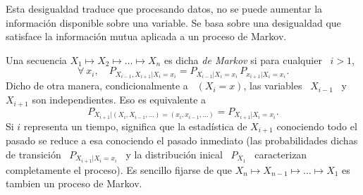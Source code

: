 
\label{Ssec:SZ:ProcDatos}

Esta  desigualdad  traduce  que  procesando  datos,  no  se  puede  aumentar  la
informaci\'on disponible sobre  una variable. Se basa sobre  una desigualdad que
satisface la informaci\'on mutua aplicada a un proceso de Markov.

\begin{definicion}
  Una secuencia  $X_1 \mapsto X_2 \mapsto  \ldots \mapsto X_n$ es  dicha {\it de
    Markov}   si   para  cualquier \   $i   >   1$,
  \[
  \forall \: x_i, \quad P_{X_{i-1},X_{i+1}|X_i=x_i} = P_{X_{i-1}|X_i=x_i} \, P_{x_{i+1}|X_i=x_i}.
  \]
  Dicho  de  otra  manera,  condicionalmente  a \  $(X_i=x)$,  las  variables  \
  $X_{i-1}$ \ y \ $X_{i+1}$ son independientes.  Eso es equivalente a
  \[
  P_{X_{i+1}|(X_i,X_{i-1},\ldots)=(x_i,x_{i-1},\ldots)} = P_{X_{i+1}|X_i=x_i}.
  \]
  Si  $i$ representa  un tiempo,  significa  que la  estad\'istica de  $X_{i+1}$
  conociendo todo el pasado se reduce  a esa conociendo el pasado inmediato (las
  probabilidades  dichas   de  transici\'on  \  $P_{X_{i+1}|X_i=x_i}$   \  y  la
  distribuci\'on inical  \ $P_{X_1}$  \ caracterizan completamente  el proceso).
  Es sencillo fijarse de que $X_n \mapsto X_{n-1} \mapsto \ldots \mapsto X_1$ es
  tambien un proceso de Markov.
\end{definicion}

